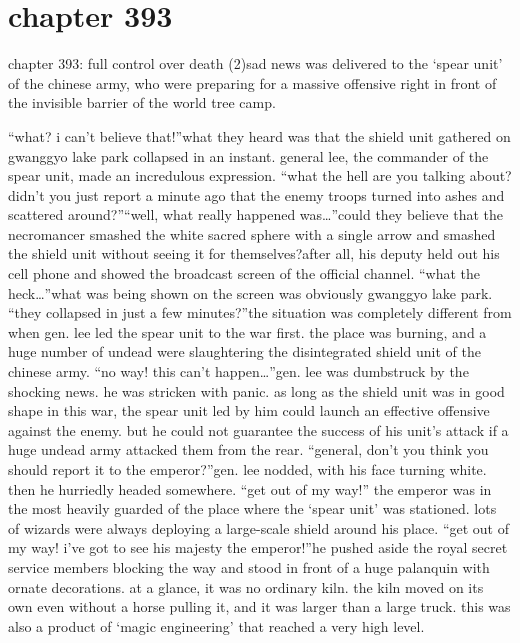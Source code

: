 \section{chapter 393}

chapter 393: full control over death (2)sad news was delivered to the ‘spear unit’ of the chinese army, who were preparing for a massive offensive right in front of the invisible barrier of the world tree camp.





“what? i can’t believe that!”what they heard was that the shield unit gathered on gwanggyo lake park collapsed in an instant.
 general lee, the commander of the spear unit, made an incredulous expression.
“what the hell are you talking about? didn’t you just report a minute ago that the enemy troops turned into ashes and scattered around?”“well, what really happened was…”could they believe that the necromancer smashed the white sacred sphere with a single arrow and smashed the shield unit without seeing it for themselves?after all, his deputy held out his cell phone and showed the broadcast screen of the official channel.
“what the heck…”what was being shown on the screen was obviously gwanggyo lake park.
“they collapsed in just a few minutes?”the situation was completely different from when gen.
 lee led the spear unit to the war first.
the place was burning, and a huge number of undead were slaughtering the disintegrated shield unit of the chinese army.
“no way! this can’t happen…”gen.
 lee was dumbstruck by the shocking news.
 he was stricken with panic.
as long as the shield unit was in good shape in this war, the spear unit led by him could launch an effective offensive against the enemy.
 but he could not guarantee the success of his unit’s attack if a huge undead army attacked them from the rear.
“general, don’t you think you should report it to the emperor?”gen.
 lee nodded, with his face turning white.
 then he hurriedly headed somewhere.
“get out of my way!”
the emperor was in the most heavily guarded of the place where the ‘spear unit’ was stationed.
 lots of wizards were always deploying a large-scale shield around his place.
“get out of my way! i’ve got to see his majesty the emperor!”he pushed aside the royal secret service members blocking the way and stood in front of a huge palanquin with ornate decorations.
 at a glance, it was no ordinary kiln.
the kiln moved on its own even without a horse pulling it, and it was larger than a large truck.
 this was also a product of ‘magic engineering’ that reached a very high level.
